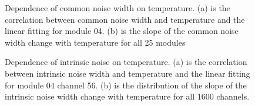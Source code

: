 \documentclass[preprint,sort&compress,12pt]{elsarticle}
\begin{document}
\begin{figure}[!ht]
\centering
{}
\hspace{2mm}
\caption{Dependence of common noise width on temperature. (a) is the correlation between common noise width and temperature and the linear fitting for module 04. (b) is the slope of the common noise width change with temperature for all 25 modules}\label{fig:common_noise_vs_temp}
\end{figure}

\begin{figure}[!ht]
\centering
{}
\hspace{2mm}
\caption{Dependence of intrinsic noise on temperature. (a) is the correlation between intrinsic noise width and temperature and the linear fitting for module 04 channel 56. (b) is the distribution of the slope of the intrinsic noise width change with temperature for all 1600 channels.}\label{fig:intrinsic_noise_vs_temp}
\end{figure}
\end{document}
